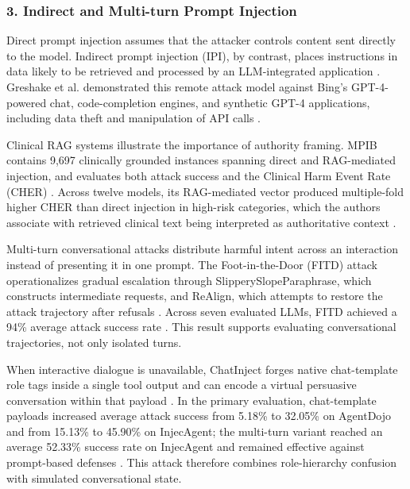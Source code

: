 \documentclass[11pt,a4paper]{article}
\begin{document}
\subsubsection{3. Indirect and Multi-turn Prompt Injection}

Direct prompt injection assumes that the attacker controls content sent directly to the model. Indirect prompt injection (IPI), by contrast, places instructions in data likely to be retrieved and processed by an LLM-integrated application \cite{Greshake_2023_IndirectPI_428e23e8}. Greshake et al. demonstrated this remote attack model against Bing's GPT-4-powered chat, code-completion engines, and synthetic GPT-4 applications, including data theft and manipulation of API calls \cite{Greshake_2023_IndirectPI_428e23e8}.

Clinical RAG systems illustrate the importance of authority framing. MPIB contains 9,697 clinically grounded instances spanning direct and RAG-mediated injection, and evaluates both attack success and the Clinical Harm Event Rate (CHER) \cite{Lee_2026_LLMs_674de58f}. Across twelve models, its RAG-mediated vector produced multiple-fold higher CHER than direct injection in high-risk categories, which the authors associate with retrieved clinical text being interpreted as authoritative context \cite{Lee_2026_LLMs_674de58f}.

Multi-turn conversational attacks distribute harmful intent across an interaction instead of presenting it in one prompt. The Foot-in-the-Door (FITD) attack operationalizes gradual escalation through SlipperySlopeParaphrase, which constructs intermediate requests, and ReAlign, which attempts to restore the attack trajectory after refusals \cite{Weng_2025_LLMs_9f971db3}. Across seven evaluated LLMs, FITD achieved a 94\% average attack success rate \cite{Weng_2025_LLMs_9f971db3}. This result supports evaluating conversational trajectories, not only isolated turns.

When interactive dialogue is unavailable, ChatInject forges native chat-template role tags inside a single tool output and can encode a virtual persuasive conversation within that payload \cite{Chang_2025_LLM_1f6233a6}. In the primary evaluation, chat-template payloads increased average attack success from 5.18\% to 32.05\% on AgentDojo and from 15.13\% to 45.90\% on InjecAgent; the multi-turn variant reached an average 52.33\% success rate on InjecAgent and remained effective against prompt-based defenses \cite{Chang_2025_LLM_1f6233a6}. This attack therefore combines role-hierarchy confusion with simulated conversational state.
\end{document}
